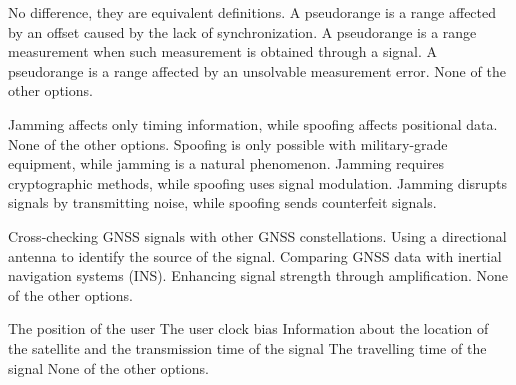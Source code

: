 \begin{checkboxes}
    \choice No difference, they are equivalent definitions.
    \CorrectChoice A pseudorange is a range affected by an offset caused by the lack of synchronization.
    \choice A pseudorange is a range measurement when such measurement is obtained through a signal.
    \choice A pseudorange is a range affected by an unsolvable measurement error.
    \choice None of the other options.
\end{checkboxes}

\begin{checkboxes}
    \choice Jamming affects only timing information, while spoofing affects positional data.
    \choice None of the other options.
    \choice Spoofing is only possible with military-grade equipment, while jamming is a natural phenomenon.
    \choice Jamming requires cryptographic methods, while spoofing uses signal modulation.
    \CorrectChoice Jamming disrupts signals by transmitting noise, while spoofing sends counterfeit signals.
\end{checkboxes}

\begin{checkboxes}
    \CorrectChoice Cross-checking GNSS signals with other GNSS constellations.
    \CorrectChoice Using a directional antenna to identify the source of the signal.
    \CorrectChoice Comparing GNSS data with inertial navigation systems (INS).
    \choice Enhancing signal strength through amplification.
    \choice None of the other options.
\end{checkboxes}

\begin{checkboxes}
    \choice The position of the user
    \choice The user clock bias
    \CorrectChoice Information about the location of the satellite and the transmission time of the signal
    \choice The travelling time of the signal
    \choice None of the other options.
\end{checkboxes}
